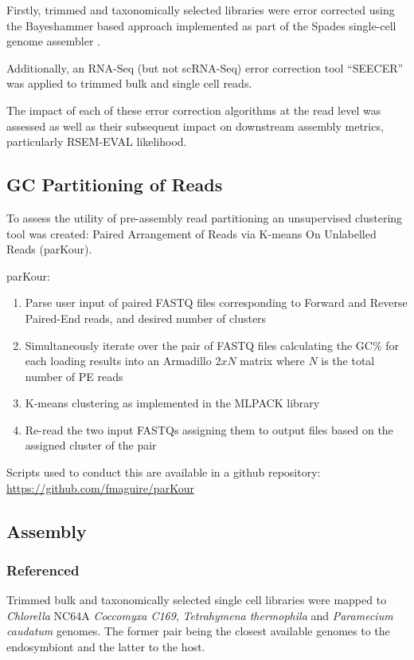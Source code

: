 Firstly, trimmed and taxonomically selected libraries were error corrected using the
Bayeshammer \citep{Nikolenko2013} based approach implemented as part of the Spades single-cell  
genome assembler \citep{Bankevich2012}.

Additionally, an RNA-Seq (but not scRNA-Seq) error correction tool ``SEECER'' \citep{Le2013} was 
applied to trimmed bulk and single cell reads.

The impact of each of these error correction algorithms at the read level was assessed as well 
as their subsequent impact on downstream assembly metrics, particularly RSEM-EVAL likelihood.


\subsection{GC Partitioning of Reads}

To assess the utility of pre-assembly read partitioning an unsupervised clustering tool was created:
Paired Arrangement of Reads via K-means On Unlabelled Reads (parKour).

parKour:
\begin{enumerate}
    \item Parse user input of paired FASTQ files corresponding to Forward and Reverse Paired-End reads, and desired number of clusters
    \item Simultaneously iterate over the pair of FASTQ files calculating the GC\% for each loading results into an Armadillo \(2xN\) matrix where \(N\) is the total number of PE reads
    \item K-means clustering as implemented in the MLPACK library
    \item Re-read the two input FASTQs assigning them to output files based on the assigned cluster of the pair
\end{enumerate}

Scripts used to conduct this are available in a github repository:
\url{https://github.com/fmaguire/parKour}

\subsection{Assembly}

\subsubsection{Referenced}

Trimmed bulk and taxonomically selected single cell libraries
were mapped to \textit{Chlorella} NC64A
\textit{Coccomyxa C169}, \textit{Tetrahymena 
thermophila} and \textit{Paramecium caudatum} genomes.
The former pair being the closest available genomes
to the endosymbiont and the latter to the host.




